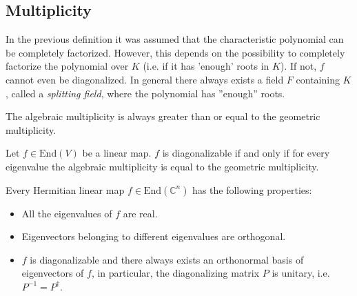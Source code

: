 \subsection{Multiplicity}

    \begin{remark}
        In the previous definition it was assumed that the characteristic polynomial can be completely factorized. However, this depends on the possibility to completely factorize the polynomial over $K$ (i.e. if it has 'enough' roots in $K$). If not, $f$ cannot even be diagonalized. In general there always exists a field $F$ containing $K$, called a \textit{splitting field}, where the polynomial has ''enough'' roots.
    \end{remark}

    \begin{property}
        The algebraic multiplicity is always greater than or equal to the geometric multiplicity.
    \end{property}
    \begin{theorem}\label{linalgebra:theorem:diagonalizable_multiplicity}
        Let $f\in\mathrm{End}(V)$ be a linear map. $f$ is diagonalizable if and only if for every eigenvalue the algebraic multiplicity is equal to the geometric multiplicity.
    \end{theorem}

    \begin{property}\label{linalgebra:diagonalizable_hermitian}
        Every Hermitian linear map $f\in\text{End}(\mathbb{C}^n)$ has the following properties:
        \begin{itemize}
            \item All the eigenvalues of $f$ are real.
            \item Eigenvectors belonging to different eigenvalues are orthogonal.
            \item $f$ is diagonalizable and there always exists an orthonormal basis of eigenvectors of $f$, in particular, the diagonalizing matrix $P$ is unitary, i.e. $P^{-1} = P^\dag$.
        \end{itemize}
    \end{property}

